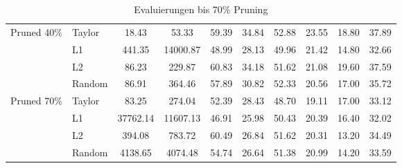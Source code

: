 \begin{table}[h]
{\begin{tabular}{l l | c c | c c c c c | r}
			\midrule
			\multirow{4}{*}{Pruned 40\%} & Taylor          & 18.43              & 53.33
			                             & 59.39           & 34.84              & 52.88
			                             & 23.55           & 18.80              & 37.89            \\

			                             & L1              & 441.35             & 14000.87
			                             & 48.99           & 28.13              & 49.96
			                             & 21.42           & 14.80              & 32.66            \\


			                             & L2              & 86.23              & 229.87
			                             & 60.83           & 34.18              & 51.62
			                             & 21.08           & 19.60              & 37.59            \\


			                             & Random          & 86.91              & 364.46
			                             & 57.89           & 30.82              & 52.33
			                             & 20.56           & 17.00              & 35.72            \\

			\midrule
			\multirow{4}{*}{Pruned 70\%} & Taylor          & 83.25              & 274.04
			                             & 52.39           & 28.43              & 48.70
			                             & 19.11           & 17.00              & 33.12            \\

			                             & L1              & 37762.14           & 11607.13
			                             & 46.91           & 25.98              & 50.43
			                             & 20.39           & 16.40              & 32.02            \\


			                             & L2              & 394.08             & 783.72
			                             & 60.49           & 26.84              & 51.62
			                             & 20.31           & 13.20              & 34.49            \\


			                             & Random          & 4138.65            & 4074.48
			                             & 54.74           & 26.64              & 51.38
			                             & 20.99           & 14.20              & 33.59            \\
			\bottomrule
			\bottomrule
		\end{tabular}}
	\caption{Evaluierungen bis 70\% Pruning}
	\label{tab:pruning70}
\end{table}

